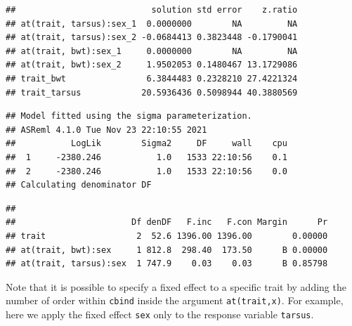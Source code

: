 \documentclass[
  12pt,
]{book}
\begin{document}
\begin{verbatim}
##                           solution std error    z.ratio
## at(trait, tarsus):sex_1  0.0000000        NA         NA
## at(trait, tarsus):sex_2 -0.0684413 0.3823448 -0.1790041
## at(trait, bwt):sex_1     0.0000000        NA         NA
## at(trait, bwt):sex_2     1.9502053 0.1480467 13.1729086
## trait_bwt                6.3844483 0.2328210 27.4221324
## trait_tarsus            20.5936436 0.5098944 40.3880569
\end{verbatim}

\begin{verbatim}
## Model fitted using the sigma parameterization.
## ASReml 4.1.0 Tue Nov 23 22:10:55 2021
##           LogLik        Sigma2     DF     wall    cpu
##  1     -2380.246           1.0   1533 22:10:56    0.1
##  2     -2380.246           1.0   1533 22:10:56    0.0
## Calculating denominator DF
\end{verbatim}

\begin{verbatim}
## 
##                       Df denDF   F.inc   F.con Margin      Pr
## trait                  2  52.6 1396.00 1396.00        0.00000
## at(trait, bwt):sex     1 812.8  298.40  173.50      B 0.00000
## at(trait, tarsus):sex  1 747.9    0.03    0.03      B 0.85798
\end{verbatim}

Note that it is possible to specify a fixed effect to a specific trait by adding the number of order within \texttt{cbind} inside the argument \texttt{at(trait,x)}. For example, here we apply the fixed effect \texttt{sex} only to the response variable \texttt{tarsus}.
\end{document}
